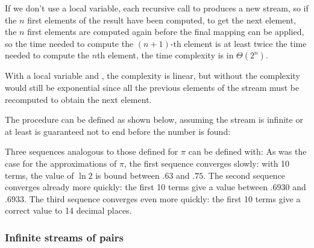 \begin{exe}[3.63]
    If we don’t use a local variable, each recursive call to  
    produces a new stream, so if the $n$ first elements of the result have been 
    computed, to get the next element, the $n$ first elements are computed again 
    before the final mapping can be applied, so the time needed to compute the 
    $(n + 1)$-th element is at least twice the time needed to compute the $n$th 
    element, the time complexity is in $\Theta(2^n)$.

    With a local variable and , the complexity is linear, but 
    without  the complexity would still be exponential since all 
    the previous elements of the stream must be recomputed to obtain the next 
    element.
\end{exe}

\begin{exe}[3.64]
    The procedure  can be defined as shown below, assuming 
    the stream is infinite or at least is guaranteed not to end before the 
    number is found:
\end{exe}

\begin{exe}[3.65]
    Three sequences analogous to those defined for $\pi$ can be defined with:
    As was the case for the approximations of $\pi$, the first sequence 
    converges slowly: with 10 terms, the value of $\ln 2$ is bound between $.63$ 
    and $.75$. The second sequence converges already more quickly: the first 10 
    terms give a value between $.6930$ and $.6933$. The third sequence converges 
    even more quickly: the first 10 terms give a correct value to 14 decimal 
    places.
\end{exe}

\subsubsection{Infinite streams of pairs}

